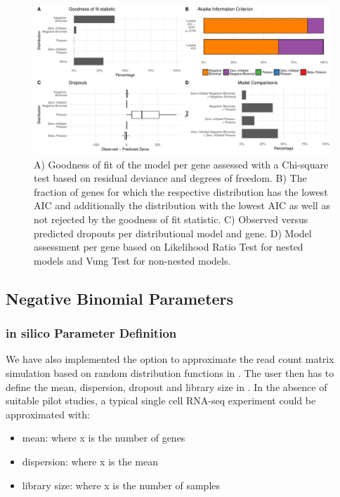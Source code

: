 \documentclass{article}\usepackage[]{graphicx}\usepackage[usenames,dvipsnames]{color}
\begin{document}
\begin{figure}[h]
\centering
\includegraphics[width=0.75\linewidth]{evaldist.pdf}
\caption{A) Goodness of fit of the model per gene assessed with a Chi-square test based on residual deviance and degrees of freedom. B) The fraction of genes for which the respective distribution has the lowest AIC and additionally the distribution with the lowest AIC as well as not rejected by the goodness of fit statistic.  C) Observed versus predicted dropouts per distributional model and gene. D) Model assessment per gene based on Likelihood Ratio Test for nested models and Vung Test for non-nested models.}
\label{fig:evaldist}
\end{figure}

\subsection{Negative Binomial Parameters}

\subsubsection{in silico Parameter Definition}

We have also implemented the option to approximate the read count matrix simulation based on random distribution functions in \R{}. The user then has to define the mean, dispersion, dropout and library size in . In the absence of suitable pilot studies, a typical single cell RNA-seq experiment could be approximated with:
\begin{itemize}
  \item mean:  where x is the number of genes
  \item dispersion:  where x is the mean
  \item library size:  where x is the number of samples
\end{itemize}
\end{document}
